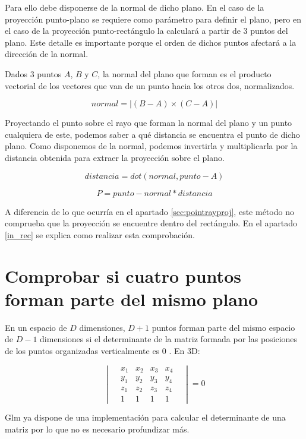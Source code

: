 Para ello debe disponerse de la normal de dicho plano. En el caso de la proyección punto-plano se requiere como parámetro para definir el plano, pero en el caso de la proyección punto-rectángulo la calculará a partir de 3 puntos del plano. Este detalle es importante porque el orden de dichos puntos afectará a la dirección de la normal.

Dados 3 puntos $A$, $B$ y $C$, la normal del plano que forman es el producto vectorial de los vectores que van de un punto hacia los otros dos, normalizados.

\[ normal = |(B - A) \times (C - A)| \]

Proyectando el punto sobre el rayo que forman la normal del plano y un punto cualquiera de este, podemos saber a qué distancia se encuentra el punto de dicho plano. Como disponemos de la normal, podemos invertirla y multiplicarla por la distancia obtenida para extraer la proyección sobre el plano.

\[ distancia = dot(normal, punto - A) \]

\[ P = punto - normal * distancia \]

A diferencia de lo que ocurría en el apartado \ref{sec:pointrayproj}, este método no comprueba que la proyección se encuentre dentro del rectángulo. En el apartado \ref{in_rec} se explica como realizar esta comprobación.


\clearpage
\section{Comprobar si cuatro puntos forman parte del mismo plano}
\label{sec:check4pointplane}
En un espacio de $D$ dimensiones, $D+1$ puntos forman parte del mismo espacio de $D-1$ dimensiones si el determinante de la matriz formada por las posiciones de los puntos organizadas verticalmente es 0 . En 3D:

\[
\begin{vmatrix}
& x_1 & x_2 & x_3 & x_4 &\\ 
& y_1 & y_2 & y_3 & y_4 &\\ 
& z_1 & z_2 & z_3 & z_4 &\\ 
& 1   & 1   & 1   & 1   &
\end{vmatrix} = 0
\]

Glm ya dispone de una implementación para calcular el determinante de una matriz por lo que no es necesario profundizar más.

